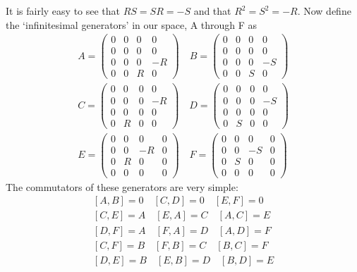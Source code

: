 \documentclass[12pt]{article}
\begin{document}
 It is fairly easy to see that $RS = SR = -S$ and that $R^2 = S^2 = -R$.
Now define the `infinitesimal generators' in our space, A through F as
\begin{eqnarray*}
A = \left( \begin{array}{cccc}
0 & 0 & 0 & 0 \\
0 & 0 & 0 & 0 \\
0 & 0 & 0 & -R \\
0 & 0 & R & 0
\end{array} \right) \quad
B = \left( \begin{array}{cccc}
0 & 0 & 0 & 0 \\
0 & 0 & 0 & 0 \\
0 & 0 & 0 & -S \\
0 & 0 & S & 0
\end{array} \right) \\		%
C = \left( \begin{array}{cccc}
0 & 0 & 0 & 0 \\
0 & 0 & 0 & -R \\
0 & 0 & 0 & 0 \\
0 & R & 0 & 0
\end{array} \right) \quad
D = \left( \begin{array}{cccc}
0 & 0 & 0 & 0 \\
0 & 0 & 0 & -S \\
0 & 0 & 0 & 0 \\
0 & S & 0 & 0
\end{array} \right) \\		%
E = \left( \begin{array}{cccc}
0 & 0 & 0 & 0 \\
0 & 0 & -R & 0 \\
0 & R & 0 & 0 \\
0 & 0 & 0 & 0
\end{array} \right) \quad
F = \left( \begin{array}{cccc}
0 & 0 & 0 & 0 \\
0 & 0 & -S & 0 \\
0 & S & 0 & 0 \\
0 & 0 & 0 & 0
\end{array} \right)
\end{eqnarray*}
The commutators of these generators are very simple:
\begin{eqnarray*}
\left[ A,B \right] = 0 \quad\left[ C,D \right] = 0 \quad\left[ E,F \right] = 0\\
\left[ C,E \right] = A \quad\left[ E,A \right] = C \quad\left[ A,C \right] = E \\
\left[ D,F \right] = A \quad\left[ F,A \right] = D \quad\left[ A,D \right] = F \\
\left[ C,F \right] = B \quad\left[ F,B \right] = C \quad\left[ B,C \right] = F\\
\left[ D,E \right] = B \quad\left[ E,B \right] = D \quad\left[ B,D \right] = E 
\end{eqnarray*}
\end{document}
